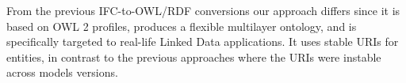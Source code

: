 
From the previous IFC-to-OWL/RDF conversions
\cite{beetz2005ontology,beetz2009ifcowl,pauwels2011interoperability} our approach differs since it
is based on OWL 2 profiles, produces a flexible multilayer ontology, and is specifically targeted to
real-life Linked Data applications. It uses stable URIs for entities, in contrast to the previous approaches
where the URIs were instable across models versions.

% 
